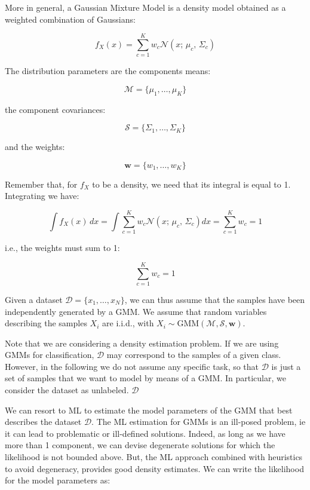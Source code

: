 More in general, a Gaussian Mixture Model is a density model obtained as a weighted combination of Gaussians:


\begin{equation*}
f_X(x) = \sum_{c=1}^K w_c \mathcal{N}(x;\, \mu_c,\, \Sigma_c)
\end{equation*}

The distribution parameters are the components means:


\begin{equation*}
\mathcal{M} = \{\mu_1, \ldots, \mu_K\}
\end{equation*}

the component covariances:


\begin{equation*}
\mathcal{S} = \{\Sigma_1, \ldots, \Sigma_K\}
\end{equation*}

and the weights:


\begin{equation*}
\mathbf{w} = \{w_1, \ldots, w_K\}
\end{equation*}

Remember that, for $f_X$ to be a density, we need that its integral is equal to 1. Integrating we have:


\begin{equation*}
\int f_X(x)\, dx = \int \sum_{c=1}^K w_c \mathcal{N}(x;\, \mu_c,\, \Sigma_c) dx = \sum_{c=1}^K w_c = 1
\end{equation*}

i.e., the weights must sum to 1:


\begin{equation*}
\sum_{c=1}^K w_c = 1
\end{equation*}

Given a dataset $\mathcal{D} = \{x_1, \ldots, x_N\}$, we can thus assume that the samples have been independently generated by a GMM. We assume that random variables describing the samples $X_i$ are i.i.d., with $X_i \sim \text{GMM}(\mathcal{M}, \mathcal{S}, \mathbf{w})$.

Note that we are considering a density estimation problem. If we are using GMMs for classification, $\mathcal{D}$ may correspond to the samples of a given class. However, in the following we do not assume any specific task, so that $\mathcal{D}$ is just a set of samples that we want to model by means of a GMM. In particular, we consider the dataset as unlabeled. $\mathcal{D}$

We can resort to ML to estimate the model parameters of the GMM that best describes the dataset $\mathcal{D}$. The ML estimation for GMMs is an ill-posed problem, ie it can lead to problematic or ill-defined solutions. Indeed, as long as we have more than 1 component, we can devise degenerate solutions for which the likelihood is not bounded above. But, the ML approach combined with heuristics to avoid degeneracy, provides good density estimates. We can write the likelihood for the model parameters as:


